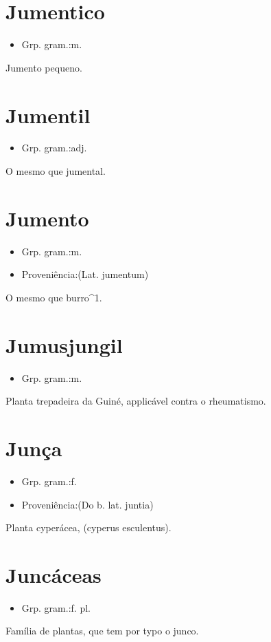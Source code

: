 \documentclass{article}
\begin{document}
\section{Jumentico}
\begin{itemize}
\item {Grp. gram.:m.}
\end{itemize}
Jumento pequeno.
\section{Jumentil}
\begin{itemize}
\item {Grp. gram.:adj.}
\end{itemize}
O mesmo que \textunderscore jumental\textunderscore .
\section{Jumento}
\begin{itemize}
\item {Grp. gram.:m.}
\end{itemize}
\begin{itemize}
\item {Proveniência:(Lat. \textunderscore jumentum\textunderscore )}
\end{itemize}
O mesmo que \textunderscore burro\textunderscore ^1.
\section{Jumusjungil}
\begin{itemize}
\item {Grp. gram.:m.}
\end{itemize}
Planta trepadeira da Guiné, applicável contra o rheumatismo.
\section{Junça}
\begin{itemize}
\item {Grp. gram.:f.}
\end{itemize}
\begin{itemize}
\item {Proveniência:(Do b. lat. \textunderscore juntia\textunderscore )}
\end{itemize}
Planta cyperácea, (\textunderscore cyperus esculentus\textunderscore ).
\section{Juncáceas}
\begin{itemize}
\item {Grp. gram.:f. pl.}
\end{itemize}
Família de plantas, que tem por typo o junco.
\end{document}
